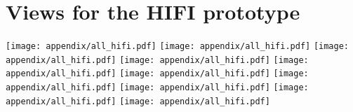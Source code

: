 \section{Views for the HIFI prototype}
\texttt{[image: appendix/all\_hifi.pdf]}
\texttt{[image: appendix/all\_hifi.pdf]}
\texttt{[image: appendix/all\_hifi.pdf]}
\texttt{[image: appendix/all\_hifi.pdf]}
\texttt{[image: appendix/all\_hifi.pdf]}
\texttt{[image: appendix/all\_hifi.pdf]}
\texttt{[image: appendix/all\_hifi.pdf]}
\texttt{[image: appendix/all\_hifi.pdf]}
\texttt{[image: appendix/all\_hifi.pdf]}
\texttt{[image: appendix/all\_hifi.pdf]}

